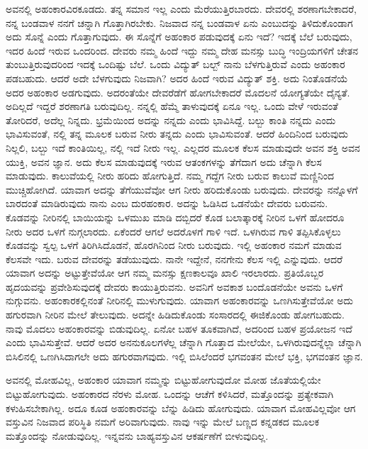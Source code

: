 ಅವನಲ್ಲಿ ಅಹಂಕಾರವಿರಕೂಡದು. ತನ್ನ ಸಮಾನ ಇಲ್ಲ ಎಂದು ಮೆರೆಯುತ್ತಿರಬಾರದು. ದೇವರಲ್ಲಿ ಶರಣಾಗಬೇಕಾದರೆ, ನನ್ನ ಬಂಡವಾಳ ನನಗೆ ಚನ್ನಾಗಿ ಗೊತ್ತಾಗಿರಬೇಕು. ನಿಜವಾದ ನನ್ನ ಬಂಡವಾಳ ಏನು ಎಂಬುದನ್ನು ತಿಳಿದುಕೊಂಡಾಗ ಅದು ಸೊನ್ನೆ ಎಂದು ಗೊತ್ತಾಗುವುದು. ಈ ಸೊನ್ನೆಗೆ ಅಹಂಕಾರ ಪಡುವುದಕ್ಕೆ ಏನು ಇದೆ? ಇದಕ್ಕೆ ಬೆಲೆ ಬರುವುದು, ಇದರ ಹಿಂದೆ ಇರುವ ಒಂದರಿಂದ. ದೇವರು ನಮ್ಮ ಹಿಂದೆ ಇದ್ದು ನಮ್ಮ ದೇಹ ಮನಸ್ಸು ಬುದ್ಧಿ ಇಂದ್ರಿಯಗಳಿಗೆ ಚೇತನ ತುಂಬುತ್ತಿರುವುದರಿಂದ ಇದಕ್ಕೆ ಒಂದಿಷ್ಟು ಬೆಲೆ. ಒಂದು ವಿದ್ಯುತ್ ಬಲ್ಬ್ ನಾನು ಬೆಳಗುತ್ತಿರುವೆ ಎಂದು ಅಹಂಕಾರ ಪಡಬಹುದು. ಆದರೆ ಅದೇ ಬೆಳಗುವುದು ನಿಜವಾಗಿ? ಅದರ ಹಿಂದೆ ಇರುವ ವಿದ್ಯುತ್ ಶಕ್ತಿ. ಅದು ನಿಂತೊಡನೆಯೆ ಅದರ ಅಹಂಕಾರ ಅಡಗುವುದು. ಅದರಂತೆಯೇ ದೇವರೆಡೆಗೆ ಹೋಗಬೇಕಾದರೆ ಮೊದಲನೆ ಯೋಗ್ಯತೆಯೇ ದೈನ್ಯತೆ. ಅದಿಲ್ಲದೆ ಇದ್ದರೆ ಶರಣಾಗತಿ ಬರುವುದಿಲ್ಲ. ನನ್ನಲ್ಲಿ ಹೆಮ್ಮೆ ತಾಳುವುದಕ್ಕೆ ಏನೂ ಇಲ್ಲ. ಒಂದು ವೇಳೆ ಇರುವಂತೆ ತೋರಿದರೆ, ಅದೆಲ್ಲ ನಿನ್ನದು. ಭ್ರಮೆಯಿಂದ ಅದನ್ನು ನನ್ನದು ಎಂದು ಭಾವಿಸಿದ್ದೆ. ಬಲ್ಬು ಕಾಂತಿ ನನ್ನದು ಎಂದು ಭಾವಿಸುವಂತೆ, ನಲ್ಲಿ ತನ್ನ ಮೂಲಕ ಬರುವ ನೀರು ತನ್ನದು ಎಂದು ಭಾವಿಸುವಂತೆ. ಆದರೆ ಹಿಂದಿನಿಂದ ಬರುವುದು ನಿಲ್ಲಲಿ, ಬಲ್ಬು ಇದೆ ಕಾಂತಿಯಿಲ್ಲ, ನಲ್ಲಿ ಇದೆ ನೀರು ಇಲ್ಲ. ಎಲ್ಲದರ ಮೂಲಕ ಕೆಲಸ ಮಾಡುವುದೇ ಅವನ ಶಕ್ತಿ ಅವನ ಯುಕ್ತಿ, ಅವನ ಜ್ಞಾನ. ಅದು ಕೆಲಸ ಮಾಡುವುದಕ್ಕೆ ಇರುವ ಆತಂಕಗಳನ್ನು ತೆಗೆದಾಗ ಅದು ಚೆನ್ನಾಗಿ ಕೆಲಸ ಮಾಡುವುದು. ಕಾಲುವೆಯಲ್ಲಿ ನೀರು ಹರಿದು ಹೋಗುತ್ತಿದೆ. ನಮ್ಮ ಗದ್ದೆಗ ನೀರು ಬರುವ ಕಾಲುವೆ ಮಣ್ಣಿನಿಂದ ಮುಚ್ಚಿಹೋಗಿದೆ. ಯಾವಾಗ ಅದನ್ನು ತೆಗೆಯುವೆವೋ ಆಗ ನೀರು ಹರಿದುಕೊಂಡು ಬರುವುದು. ದೇವರನ್ನು ನನ್ನೊಳಗೆ ಬಾರದಂತೆ ಮಾಡಿರುವುದು ನಾನು ಎಂಬ ದುರಹಂಕಾರ. ಅದನ್ನು ಓಡಿಸಿದ ಒಡನೆಯೇ ದೇವರು ಬರುವನು. ಕೊಡವನ್ನು ನೀರಿನಲ್ಲಿ ಬಾಯಿಯನ್ನು ಒಳಮುಖ ಮಾಡಿ ದಬ್ಬಿದರೆ ಕೊಡ ಬಲಾತ್ಕಾರಕ್ಕೆ ನೀರಿನ ಒಳಗೆ ಹೋದರೂ ನೀರು ಅದರ ಒಳಗೆ ನುಗ್ಗಲಾರದು. ಏಕೆಂದರೆ ಆಗಲೆ ಅದರೊಳಗೆ ಗಾಳಿ ಇದೆ. ಒಳಗಿರುವ ಗಾಳಿ ತಪ್ಪಿಸಿಕೊಳ್ಳಲು ಕೊಡವನ್ನು ಸ್ವಲ್ಪ ಒಳಗೆ ತಿರಿಗಿಸಿದೊಡನೆ, ಹೊರಗಿನಿಂದ ನೀರು ಬರುವುದು. ಇಲ್ಲಿ ಅಹಂಕಾರ ನಮಗೆ ಮಾಡುವ ಕೆಲಸವೇ ಇದು. ಬರುವ ದೇವರನ್ನು ತಡೆಯುವುದು. ನಾನೇ ಇದ್ದೇನೆ, ನನಗೇನು ಕೆಲಸ ಇಲ್ಲಿ ಎನ್ನುವುದು. ಆದರೆ ಯಾವಾಗ ಅದನ್ನು ಅಟ್ಟುತ್ತೇವೆಯೋ ಆಗ ನಮ್ಮ ಮನಸ್ಸು ಕ್ಷಣಕಾಲವೂ ಖಾಲಿ ಇರಲಾರದು. ಪ್ರತಿಯೊಬ್ಬರ ಹೃದಯವನ್ನು ಪ್ರವೇಶಿಸುವುದಕ್ಕೆ ದೇವರು ಕಾಯುತ್ತಿರುವನು. ಅವನಿಗೆ ಅವಕಾಶ ಬಂದೊಡನೆಯೇ ಅವನು ಒಳಗೆ ನುಗ್ಗುವನು. ಅಹಂಕಾರಕಲ್ಲಿನಂತೆ ನೀರಿನಲ್ಲಿ ಮುಳುಗುವುದು. ಯಾವಾಗ ಅಹಂಕಾರವನ್ನು ಒಣಗಿಸುತ್ತೇವೆಯೋ ಅದು ಹಗುರವಾಗಿ ನೀರಿನ ಮೇಲೆ ತೇಲುವುದು. ಅದನ್ನೇ ಹಿಡಿದುಕೊಂಡು ಸಂಸಾರದಲ್ಲಿ ಈಜಿಕೊಂಡು ಹೋಗಬಹುದು. ನಾವು ಮೊದಲು ಅಹಂಕಾರವನ್ನು ಬಿಡುವುದಿಲ್ಲ. ಏನೋ ಬಹಳ ತೂಕವಾಗಿದೆ, ಅದರಿಂದ ಬಹಳ ಪ್ರಯೋಜನ ಇದೆ ಎಂದು ಭಾವಿಸುತ್ತೇವೆ. ಆದರೆ ಅದರ ಅನನುಕೂಲಗಳೆಲ್ಲ ಚೆನ್ನಾಗಿ ಗೊತ್ತಾದ ಮೇಲೆಯೇ, ಒಳಗಿರುವುದನ್ನೆಲ್ಲಾ ಚೆನ್ನಾಗಿ ಬಿಸಿಲಿನಲ್ಲಿ ಒಣಗಿಸಿದಾಗಲೇ ಅದು ಹಗುರವಾಗವುದು. ಇಲ್ಲಿ ಬಿಸಿಲೆಂದರೆ ಭಗವಂತನ ಮೇಲೆ ಭಕ್ತಿ, ಭಗವಂತನ ಜ್ಞಾನ.

ಅವನಲ್ಲಿ ಮೋಹವಿಲ್ಲ, ಅಹಂಕಾರ ಯಾವಾಗ ನಮ್ಮನ್ನು ಬಿಟ್ಟುಹೋಗುವುದೋ ಮೋಹ ಜೊತೆಯಲ್ಲಿಯೇ ಬಿಟ್ಟುಹೋಗುವುದು. ಅಹಂಕಾರದ ನೆರಳು ಮೋಹ. ಒಂದನ್ನು ಆಚೆಗೆ ಕಳಿಸಿದರೆ, ಮತ್ತೊಂದನ್ನು ಪ್ರತ್ಯೇಕವಾಗಿ ಕಳುಹಿಸಬೇಕಾಗಿಲ್ಲ. ಅದೂ ಕೂಡ ಅಹಂಕಾರವನ್ನು ಬೆನ್ನು ಹಿಡಿದು ಹೋಗುವುದು. ಯಾವಾಗ ಮೋಹವಿಲ್ಲವೋ ಆಗ ವಸ್ತುವಿನ ನಿಜವಾದ ಪರಿಸ್ಥಿತಿ ನಮಗೆ ಅರಿವಾಗುವುದು. ನಾವು ಇನ್ನು ಮೇಲೆ ಬಣ್ಣದ ಕನ್ನಡಕದ ಮೂಲಕ ಮತ್ತೊಂದನ್ನು ನೋಡುವುದಿಲ್ಲ. ಇನ್ನವನು ಬಾಹ್ಯವಸ್ತುವಿನ ಆಕರ್ಷಣೆಗೆ ಬೀಳುವುದಿಲ್ಲ.

